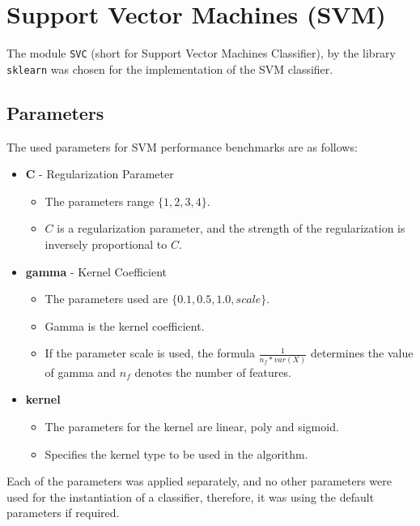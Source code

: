 \documentclass{article}[12pt]
\theoremstyle{mydef}
\begin{document}


    \section{Support Vector Machines (SVM)}
    \label{sec:svm}

        The module \texttt{SVC} (short for Support Vector Machines Classifier), 
        by the library \texttt{sklearn} was chosen for the implementation of the SVM classifier.

        \subsection{Parameters}
            The used parameters for SVM performance benchmarks are as follows: 

            \begin{itemize}
                \item \textbf{C} - Regularization Parameter
                    \begin{itemize}
                        \item The parameters range $\{1, 2, 3, 4\}$.
                        \item $C$ is a regularization parameter, and the strength of the regularization is inversely proportional to $C$.
                    \end{itemize}

                \item \textbf{gamma} - Kernel Coefficient
                \begin{itemize}
                    \item The parameters used are $\{0.1, 0.5, 1.0, scale\}$.
                    \item Gamma is the kernel coefficient. 
                    \item If the parameter scale is used, the formula $\frac{1}{n_f * var(X)}$ determines the value of gamma and $n_f$ denotes the number of features.
                \end{itemize} 

                \item \textbf{kernel}
                \begin{itemize}
                    \item The parameters for the kernel are linear, poly and sigmoid.
                    \item Specifies the kernel type to be used in the algorithm.
                \end{itemize}
            \end{itemize}
            Each of the parameters was applied separately, and no other parameters were used for the instantiation of a classifier,
            therefore, it was using the default parameters if required.
            
\end{document}
